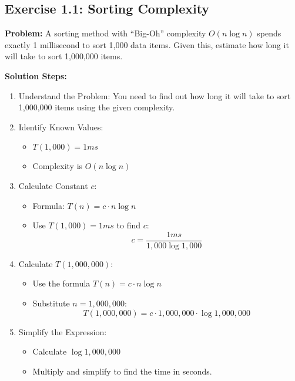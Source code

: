 \clearpage

\subsection{Exercise 1.1: Sorting Complexity}
\textbf{Problem:} A sorting method with “Big-Oh” complexity $O(n \log n)$ spends exactly 1 millisecond to sort 1,000 data items. Given this, estimate how long it will take to sort 1,000,000 items.

\vspace{0.5em}
\textbf{Solution Steps:}
\begin{enumerate}[leftmargin=*,noitemsep]
    \item Understand the Problem: You need to find out how long it will take to sort 1,000,000 items using the given complexity.
    \item Identify Known Values:
    \begin{itemize}
        \item $T(1,000) = 1ms$
        \item Complexity is $O(n \log n)$
    \end{itemize}
    \item Calculate Constant $c$:
    \begin{itemize}
        \item Formula: $T(n) = c \cdot n \log n$
        \item Use $T(1,000) = 1ms$ to find $c$:
        \[ c = \frac{1ms}{1,000 \log 1,000} \]
    \end{itemize}
    \item Calculate $T(1,000,000)$:
    \begin{itemize}
        \item Use the formula $T(n) = c \cdot n \log n$
        \item Substitute $n = 1,000,000$:
        \[ T(1,000,000) = c \cdot 1,000,000 \cdot \log 1,000,000 \]
    \end{itemize}
    \item Simplify the Expression:
    \begin{itemize}
        \item Calculate $\log 1,000,000$
        \item Multiply and simplify to find the time in seconds.
    \end{itemize}
\end{enumerate}


